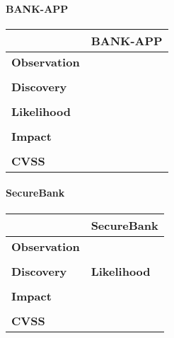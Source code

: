 \paragraph{BANK-APP} \mbox{}
\begin{longtable*}{p{.20\textwidth} | p{.80\textwidth}}
    \hline
    & \textbf{BANK-APP} \\ 
    \hline
    \textbf{Observation} &
        
    \\\\
    \textbf{Discovery} &
        
    \\\\
    \textbf{Likelihood} &
        
    \\\\
    \textbf{Impact} &
       
    \\\\
    \textbf{CVSS} &
        
    \\
    \hline
\end{longtable*}
\paragraph{SecureBank} \mbox{}
\begin{longtable*}{p{.20\textwidth} | p{.80\textwidth}}
    \hline
    & \textbf{SecureBank} \\ 
    \hline
    \textbf{Observation} &
       
    \\\\
    \textbf{Discovery} &
        
    \textbf{Likelihood} &
       
    \\\\
    \textbf{Impact} &
        
    \\\\
    \textbf{CVSS} &
        
    \\
    \hline
\end{longtable*}